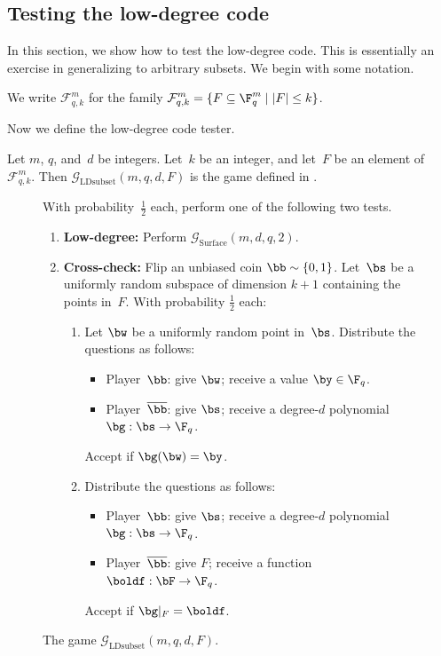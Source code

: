 \documentclass[11pt]{article}
\newcommand{\game}{\mathscr{G}}
\begin{document}
\subsection{Testing the low-degree code}\label{sec:testing-low-deg}

In this section, we show how to test the low-degree code.
This is essentially an exercise in generalizing  to arbitrary subsets.
We begin with some notation.

\begin{notation}
We write $\mathcal{F}_{q, k}^{m}$ for the family
$\displaystyle
\mathcal{F}^m_{q, k} = \{F \subseteq \F_q^m \mid |F| \leq k\}
$.
\end{notation}

Now we define the low-degree code tester.

\begin{definition}
Let $m$, $q$, and~$d$ be integers.  Let~$k$ be an integer, and let~$F$ be an element of~$\mathcal{F}^m_{q, k}$.
Then $\game_{\mathrm{LDsubset}}(m, q, d, F)$ is the game defined in .
\end{definition}

{
\begin{figure}
With probability~$\tfrac{1}{2}$ each, perform one of the following two tests.
\begin{enumerate}
	\item \textbf{Low-degree:} Perform $\game_{\mathrm{Surface}}(m, d, q,2)$. \label{item:low-deg-point}
	\item \textbf{Cross-check:}
			Flip an unbiased coin $\bb \sim \{0, 1\}$.
			Let~$\bs$ be a uniformly random subspace of dimension $k+1$ containing the points in~$F$.
			 With probability $\tfrac{1}{2}$ each:
			\begin{enumerate}
			\item Let $\bw$ be a uniformly random point in~$\bs$. Distribute the questions as follows:\label{item:bootstrapping-to-subspaces}
				\begin{itemize}
				\item[$\circ$] Player~$\bb$: give $\bw$; receive a value $\by \in \F_q$.
				\item[$\circ$] Player~$\overline{\bb}$: give $\bs$; receive a degree-$d$ polynomial $\bg:\bs \rightarrow \F_q$.
				\end{itemize}
				Accept if $\bg(\bw) = \by$.
			\item Distribute the questions as follows: \label{item:boosting-to-subsets}
				\begin{itemize}
				\item[$\circ$] Player~$\bb$: give $\bs$; receive a degree-$d$ polynomial $\bg:\bs \rightarrow \F_q$.
				\item[$\circ$] Player~$\overline{\bb}$: give $F$; receive a function $\boldf:\bF \rightarrow \F_q$.
				\end{itemize}
				Accept if $\bg|_{F} = \boldf$.
			\end{enumerate}
	\end{enumerate}
	\caption{The game $\game_{\mathrm{LDsubset}}(m, q, d, F)$. \label{fig:classical-subset}}
\end{figure}
}
\end{document}
